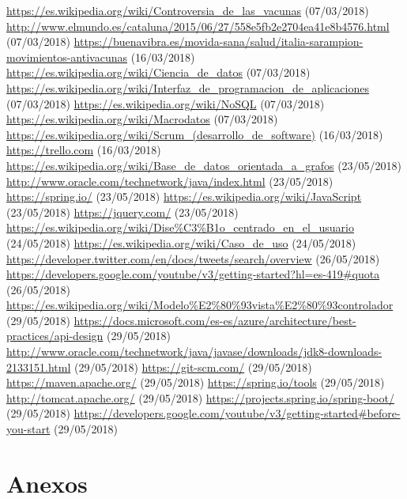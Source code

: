 \documentclass[11pt,a4paper]{article}
\begin{document}
\begin{thebibliography}{0}
   \url{https://es.wikipedia.org/wiki/Controversia_de_las_vacunas} (07/03/2018)
   \url{http://www.elmundo.es/cataluna/2015/06/27/558e5fb2e2704ea41e8b4576.html} (07/03/2018)
   \url{https://buenavibra.es/movida-sana/salud/italia-sarampion-movimientos-antivacunas} (16/03/2018)
   \url{https://es.wikipedia.org/wiki/Ciencia_de_datos} (07/03/2018)
   \url{https://es.wikipedia.org/wiki/Interfaz_de_programacion_de_aplicaciones} (07/03/2018)
   \url{https://es.wikipedia.org/wiki/NoSQL} (07/03/2018)
   \url{https://es.wikipedia.org/wiki/Macrodatos} (07/03/2018)
   \url{https://es.wikipedia.org/wiki/Scrum_(desarrollo_de_software)} (16/03/2018)
   \url{https://trello.com} (16/03/2018)
   \url{https://es.wikipedia.org/wiki/Base_de_datos_orientada_a_grafos} (23/05/2018)
   \url{http://www.oracle.com/technetwork/java/index.html} (23/05/2018)
   \url{https://spring.io/} (23/05/2018)
   \url{https://es.wikipedia.org/wiki/JavaScript} (23/05/2018)
   \url{https://jquery.com/} (23/05/2018)
   \url{https://es.wikipedia.org/wiki/Dise%C3%B1o_centrado_en_el_usuario} (24/05/2018)
   \url{https://es.wikipedia.org/wiki/Caso_de_uso} (24/05/2018) 
   \url{https://developer.twitter.com/en/docs/tweets/search/overview} (26/05/2018) 
   \url{https://developers.google.com/youtube/v3/getting-started?hl=es-419#quota} (26/05/2018) 
   \url{https://es.wikipedia.org/wiki/Modelo%E2%80%93vista%E2%80%93controlador} (29/05/2018) 
   \url{https://docs.microsoft.com/es-es/azure/architecture/best-practices/api-design} (29/05/2018) 
   \url{http://www.oracle.com/technetwork/java/javase/downloads/jdk8-downloads-2133151.html} (29/05/2018) 
   \url{https://git-scm.com/} (29/05/2018) 
   \url{https://maven.apache.org/} (29/05/2018) 
   \url{https://spring.io/tools} (29/05/2018) 
   \url{http://tomcat.apache.org/} (29/05/2018) 
   \url{https://projects.spring.io/spring-boot/} (29/05/2018) 
   \url{https://developers.google.com/youtube/v3/getting-started#before-you-start} (29/05/2018) 
\end{thebibliography}
\newpage 


\section{Anexos}
\bigskip
\end{document}
